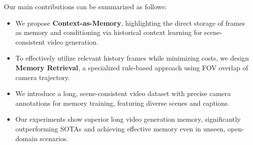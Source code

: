 
Our main contributions can be summarized as follows:
\begin{itemize}
    \item We propose \textbf{Context-as-Memory}, highlighting the direct storage of frames as memory and conditioning via historical context learning for scene-consistent video generation.
    \item To effectively utilize relevant history frames while minimizing costs, we design \textbf{Memory Retrieval}, a specialized rule-based approach using FOV overlap of camera trajectory.
    \item We introduce a long, scene-consistent video dataset with precise camera annotations for memory training, featuring diverse scenes and captions.
    \item Our experiments show superior long video generation memory, significantly outperforming SOTAs and achieving effective memory even in unseen, open-domain scenarios.
\end{itemize}
